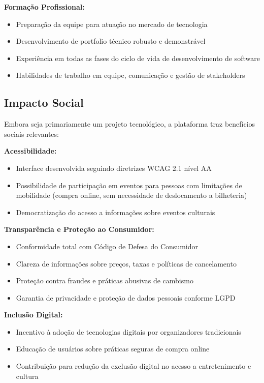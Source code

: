 \textbf{Formação Profissional:}
\begin{itemize}
    \item Preparação da equipe para atuação no mercado de tecnologia
    \item Desenvolvimento de portfolio técnico robusto e demonstrável
    \item Experiência em todas as fases do ciclo de vida de desenvolvimento de software
    \item Habilidades de trabalho em equipe, comunicação e gestão de stakeholders
\end{itemize}

\subsection{Impacto Social}

Embora seja primariamente um projeto tecnológico, a plataforma traz benefícios sociais relevantes:

\textbf{Acessibilidade:}
\begin{itemize}
    \item Interface desenvolvida seguindo diretrizes WCAG 2.1 nível AA~\cite{WCAG:2018}
    \item Possibilidade de participação em eventos para pessoas com limitações de mobilidade (compra online, sem necessidade de deslocamento a bilheteria)
    \item Democratização do acesso a informações sobre eventos culturais
\end{itemize}

\textbf{Transparência e Proteção ao Consumidor:}
\begin{itemize}
    \item Conformidade total com Código de Defesa do Consumidor
    \item Clareza de informações sobre preços, taxas e políticas de cancelamento
    \item Proteção contra fraudes e práticas abusivas de cambismo
    \item Garantia de privacidade e proteção de dados pessoais conforme LGPD
\end{itemize}

\textbf{Inclusão Digital:}
\begin{itemize}
    \item Incentivo à adoção de tecnologias digitais por organizadores tradicionais
    \item Educação de usuários sobre práticas seguras de compra online
    \item Contribuição para redução da exclusão digital no acesso a entretenimento e cultura
\end{itemize}

